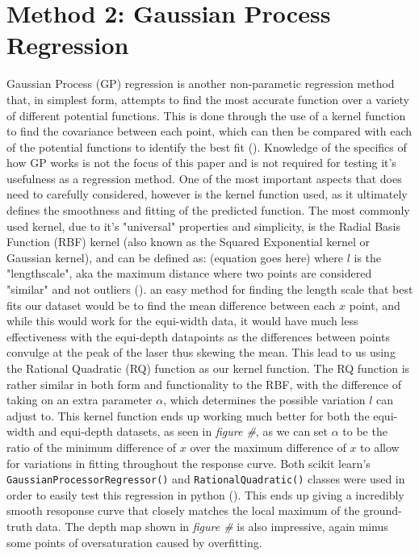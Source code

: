 \documentclass[letterpaper,12pt]{article}
\begin{document}
\section{Method 2: Gaussian Process Regression}
Gaussian Process (GP) regression is another non-parametic regression method that, in simplest
form, attempts to find the most accurate function over a variety of different potential functions.
This is done through the use of a kernel function to find the covariance between each point, which
can then be compared with each of the potential functions to identify the best fit 
(\cite{wang2020intuitive}). Knowledge of the specifics of how GP works is not the focus of
this paper and is not required for testing it's usefulness as a regression method. One of
the most important aspects that does need to carefully considered, however is the kernel 
function used, as it ultimately defines the smoothness and fitting of the predicted function.
The most commonly used kernel, due to it's "universal" properties and simplicity, is the
Radial Basis Function (RBF) kernel (also known as the Squared Exponential kernel or Gaussian
kernel), and can be defined as: (equation goes here) where $l$ is the "lengthscale", aka the
maximum distance where two points are considered "similar" and not outliers (\cite{Duvenaud}). 
an easy method for finding the length scale that best fits our dataset would be to find the 
mean difference between each $x$ point, and while this would work for the equi-width data,
it would have much less effectiveness with the equi-depth datapoints as the differences between 
points convulge at the peak of the laser thus skewing the mean. This lead to us using the 
Rational Quadratic (RQ) function as our kernel function. The RQ function is rather similar in 
both form and functionality to the RBF, with the difference of taking on an extra parameter 
$\alpha$, which determines the possible variation $l$ can adjust to. This kernel function ends 
up working much better for both the equi-width and equi-depth datasets, as seen in \emph{figure \#},
as we can set $\alpha$ to be the ratio of the minimum difference of $x$ over the maximum difference 
of $x$ to allow for variations in fitting throughout the response curve. Both scikit learn's 
\verb|GaussianProcessorRegressor()| and \verb|RationalQuadratic()| classes were used in order
to easily test this regression in python (\cite{scikit-learn}). This ends up giving a incredibly 
smooth resoponse curve that closely matches the local maximum of the ground-truth data. The depth
map shown in \emph{figure \#} is also impressive, again minus some points of oversaturation
caused by overfitting.
\end{document}
